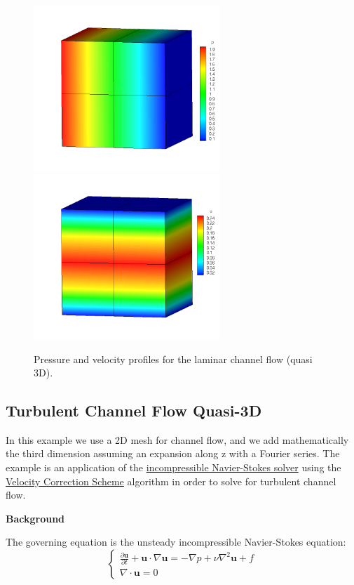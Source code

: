 
\begin{figure}
\begin{center}
\includegraphics[width=7cm]{Figures/CF3DCVP3PR.png}
\includegraphics[width=7cm]{Figures/CF3DCVP3.png}
\caption{Pressure and velocity profiles for the laminar channel flow (quasi 3D).}
\end{center}
\end{figure}


\subsection{Turbulent Channel Flow Quasi-3D}
In this example we use a 2D mesh for channel flow, and we add mathematically the third dimension assuming an expansion along z with a Fourier series. The example is an application of the \hyperref[IncNSsolver]{incompressible Navier-Stokes solver} using the \hyperref[VCSscheme]{Velocity Correction Scheme} algorithm in order to solve for turbulent channel flow.

\textbf{Background}

The governing equation is the unsteady incompressible Navier-Stokes equation:
\begin{equation}
\begin{cases}
\frac{\partial \textbf{u}}{\partial t} + \textbf{u} \cdot \nabla \textbf{u} = - \nabla p + \nu \nabla^2 \textbf{u} + f \\
\nabla \cdot \textbf{u} = 0
\label{IncNS_equations}
\end{cases}
\end{equation}

